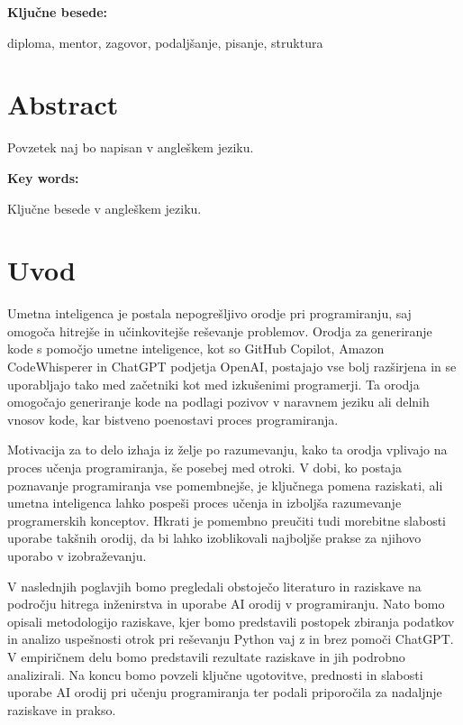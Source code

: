 \documentclass[12pt,a4paper]{book}
\begin{document}
\vspace{1.3cm}
\noindent
{\large \bf Ključne besede:}

\vspace{0.5cm}
\noindent
diploma, mentor, zagovor, podaljšanje, pisanje, struktura


\chapter*{Abstract}


Povzetek naj bo napisan v angleškem jeziku.

\vspace{1.3cm}
\noindent
{\large \bf Key words:}

\vspace{0.5cm}
\noindent
Ključne besede v angleškem jeziku.



\chapter{Uvod}

Umetna inteligenca je postala nepogrešljivo orodje pri programiranju, saj omogoča hitrejše in učinkovitejše reševanje problemov. Orodja za generiranje kode s pomočjo umetne inteligence, kot so GitHub Copilot, Amazon CodeWhisperer in ChatGPT podjetja OpenAI, postajajo vse bolj razširjena in se uporabljajo tako med začetniki kot med izkušenimi programerji. Ta orodja omogočajo generiranje kode na podlagi pozivov v naravnem jeziku ali delnih vnosov kode, kar bistveno poenostavi proces programiranja.

Motivacija za to delo izhaja iz želje po razumevanju, kako ta orodja vplivajo na proces učenja programiranja, še posebej med otroki. V dobi, ko postaja poznavanje programiranja vse pomembnejše, je ključnega pomena raziskati, ali umetna inteligenca lahko pospeši proces učenja in izboljša razumevanje programerskih konceptov. Hkrati je pomembno preučiti tudi morebitne slabosti uporabe takšnih orodij, da bi lahko izoblikovali najboljše prakse za njihovo uporabo v izobraževanju.

V naslednjih poglavjih bomo pregledali obstoječo literaturo in raziskave na področju hitrega inženirstva in uporabe AI orodij v programiranju. Nato bomo opisali metodologijo raziskave, kjer bomo predstavili postopek zbiranja podatkov in analizo uspešnosti otrok pri reševanju Python vaj z in brez pomoči ChatGPT. V empiričnem delu bomo predstavili rezultate raziskave in jih podrobno analizirali. Na koncu bomo povzeli ključne ugotovitve, prednosti in slabosti uporabe AI orodij pri učenju programiranja ter podali priporočila za nadaljnje raziskave in prakso.
\end{document}
